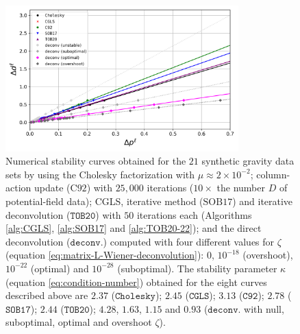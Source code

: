 \begin{figure}[htbp]
	\begin{center}
		\includegraphics[width=9cm]{Fig/stability-comparison}
	\end{center}
	\caption{
		Numerical stability curves obtained for the $21$ synthetic gravity data sets 
		by using the Cholesky factorization with $\mu \approx 2 \times 10^{-2}$; 
		column-action update ($\mathrm{C92}$) with $25,000$ iterations ($10 \times$ the number $D$ of potential-field data); 
		CGLS, iterative method ($\mathrm{SOB17}$) and iterative deconvolution
		($\mathtt{TOB20}$) with $50$ iterations each (Algorithms \ref{alg:CGLS}, \ref{alg:SOB17} and \ref{alg:TOB20-22}); 
		and the direct deconvolution ($\mathtt{deconv.}$) computed with four different values for $\zeta$ 
		(equation \ref{eq:matrix-L-Wiener-deconvolution}): $0$, $10^{-18}$ (overshoot), $10^{-22}$ (optimal)
		and $10^{-28}$ (suboptimal).
		The stability parameter $\kappa$ (equation \ref{eq:condition-number}) obtained for the eight curves described above are 
		$2.37$ ($\mathtt{Cholesky}$);
		$2.45$ ($\mathtt{CGLS}$);
		$3.13$ ($\mathtt{C92}$);
		$2.78$ ($\mathtt{SOB17}$); 
		$2.44$ ($\mathtt{TOB20}$); 
		$4.28$, $1.63$, $1.15$ and $0.93$ 
		($\mathtt{deconv.}$ with null, suboptimal, optimal and overshoot $\zeta$).
		}
	\label{fig:stability-comparison}
\end{figure}

